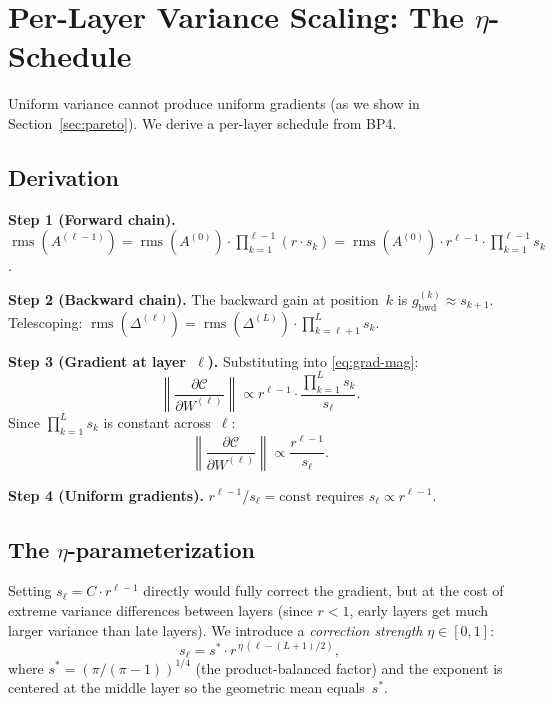 \documentclass[11pt,a4paper]{article}
\theoremstyle{definition}
\newcommand{\rms}{\operatorname{rms}}
\begin{document}
\section{Per-Layer Variance Scaling: The $\eta$-Schedule}
\label{sec:layer-balanced}

Uniform variance cannot produce uniform gradients (as we show in
Section~\ref{sec:pareto}).  We derive a per-layer schedule from BP4.

\subsection{Derivation}
\label{sec:eta-derivation}

\textbf{Step 1 (Forward chain).}
$\rms(A^{(\ell-1)}) = \rms(A^{(0)}) \cdot \prod_{k=1}^{\ell-1} (r \cdot s_k)
                     = \rms(A^{(0)}) \cdot r^{\ell-1} \cdot \prod_{k=1}^{\ell-1} s_k$.

\textbf{Step 2 (Backward chain).}
The backward gain at position~$k$ is $g_{\mathrm{bwd}}^{(k)} \approx s_{k+1}$.
Telescoping: $\rms(\Delta^{(\ell)}) = \rms(\Delta^{(L)}) \cdot \prod_{k=\ell+1}^{L} s_k$.

\textbf{Step 3 (Gradient at layer~$\ell$).}
Substituting into \eqref{eq:grad-mag}:
\begin{equation}\label{eq:gradient-formula}
  \left\|\frac{\partial\mathcal{C}}{\partial W^{(\ell)}}\right\|
  \propto r^{\ell-1} \cdot \frac{\prod_{k=1}^{L} s_k}{s_\ell}.
\end{equation}
Since $\prod_{k=1}^L s_k$ is constant across~$\ell$:
\begin{equation}\label{eq:gradient-simple}
  \boxed{\;\left\|\frac{\partial\mathcal{C}}{\partial W^{(\ell)}}\right\|
  \propto \frac{r^{\ell-1}}{s_\ell}.\;}
\end{equation}

\textbf{Step 4 (Uniform gradients).}
$r^{\ell-1}/s_\ell = \text{const}$ requires $s_\ell \propto r^{\ell-1}$.

\subsection{The $\eta$-parameterization}
\label{sec:eta-param}

Setting $s_\ell = C \cdot r^{\ell-1}$ directly would fully correct the gradient,
but at the cost of extreme variance differences between layers (since $r < 1$,
early layers get much larger variance than late layers).  We introduce a
\emph{correction strength} $\eta \in [0,1]$:
\begin{equation}\label{eq:eta-schedule}
  s_\ell = s^{\ast} \cdot r^{\,\eta\,(\ell - (L+1)/2)},
\end{equation}
where $s^{\ast} = (\pi/(\pi-1))^{1/4}$ (the product-balanced factor) and the
exponent is centered at the middle layer so the geometric mean equals~$s^{\ast}$.
\end{document}
